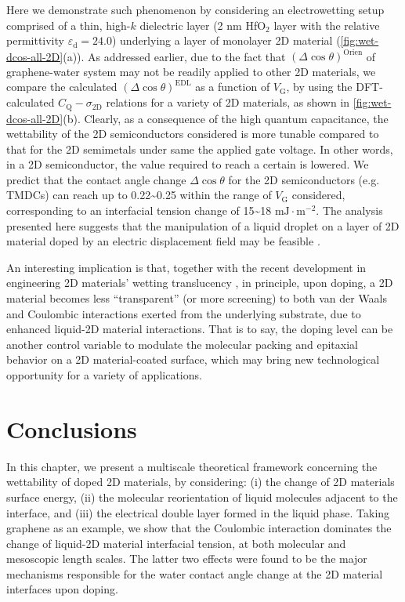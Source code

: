 Here we demonstrate such phenomenon by considering an electrowetting
setup comprised of a thin, high-\(k\) dielectric layer (2 nm
HfO\(_{\text{2}}\) layer with the relative permittivity
\(\varepsilon_{\mathrm{d}}=24.0\)) underlying a layer of monolayer 2D
material (\autoref{fig:wet-dcos-all-2D}(a)).  As addressed earlier, due
to the fact that \((\Delta \cos \theta)^{\mathrm{Orien}}\) of
graphene-water system may not be readily applied to other 2D
materials, we compare the calculated
\((\Delta \cos \theta)^{\mathrm{EDL}}\) as a function of
\(V_{\mathrm{G}}\), by using the DFT-calculated
\(C_{\mathrm{Q}} - \sigma_{\mathrm{2D}}\) relations for a variety of
2D materials, as shown in \autoref{fig:wet-dcos-all-2D}(b). Clearly, as a
consequence of the high quantum capacitance, the wettability of the 2D
semiconductors considered is more tunable compared to that for the 2D
semimetals under same the applied gate voltage. In other words, in a 2D
semiconductor, the value required to reach a certain is lowered. We
predict that the contact angle change \(\Delta \cos \theta\) for the
2D semiconductors (e.g. TMDCs) can reach up to
0.22\textasciitilde{}0.25 within the range of \(V_{\mathrm{G}}\)
considered, corresponding to an interfacial tension change of
15\textasciitilde{}18 \(\mathrm{mJ} \cdot \mathrm{m}^{-2}\). The
analysis presented here suggests that the manipulation of a liquid
droplet on a layer of 2D material doped by an electric displacement
field may be feasible \cite{Mugele_2005_EW_rev,Hayes_2003_nature_EWOD}.

An interesting implication is that, together with the recent
development in engineering 2D materials’ wetting translucency
\cite{Raj_2013_wetting_rev,rafiee_2012_transparency,Shih_2012_prl,shih_2013_wetting_natmat},
in principle, upon doping, a 2D material becomes less “transparent” (or more screening)
to both van der Waals and Coulombic interactions exerted from the underlying
substrate, due to enhanced liquid-2D material interactions. That is to say, the doping level can be
another control variable to modulate the molecular packing and
epitaxial behavior on a 2D material-coated surface, which may bring
new technological opportunity for a variety of applications.


\section{Conclusions}
\label{sec:wet-conclusions}

In this chapter, we present a multiscale theoretical framework
concerning the wettability of doped 2D materials, by considering: (i)
the change of 2D materials surface energy, (ii) the molecular
reorientation of liquid molecules adjacent to the interface, and (iii)
the electrical double layer formed in the liquid phase. Taking
graphene as an example, we show that the Coulombic interaction
dominates the change of liquid-2D material interfacial tension, at
both molecular and mesoscopic length scales. The latter two effects were
found to be the major mechanisms responsible for the water contact angle
change at the 2D material interfaces upon doping.

